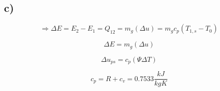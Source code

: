 

\subsection*{c)}
\[
\Rightarrow \Delta E = E_2 - E_1 = Q_{12} = m_g (\Delta u) = m_g c_p (T_{1,s} - T_{0})
\]

\[
\Delta E = m_g (\Delta u)
\]

\[
\Delta u_{ps} = c_p (\Psi \Delta T)
\]

\[
c_p = R + c_v = 0.7533 \frac{kJ}{kgK}
\]